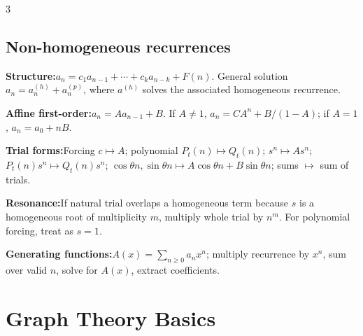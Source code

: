 \documentclass[10pt]{article}
\newenvironment{cheatitems}{\par\vspace{-1pt}}{\par\vspace{-1pt}}
\newcommand{\cheatrow}[2]{\par\noindent\textbf{#1:}\enspace #2\par}
\begin{document}
\begin{multicols}{3}
\subsection*{Non-homogeneous recurrences}
\begin{cheatitems}
\cheatrow{Structure}{$a_n=c_1a_{n-1}+\cdots+c_ka_{n-k}+F(n)$. General solution $a_n=a_n^{(h)}+a_n^{(p)}$, where $a^{(h)}$ solves the associated homogeneous recurrence.}
\cheatrow{Affine first-order}{$a_n=Aa_{n-1}+B$. If $A\ne1$, $a_n=CA^n+B/(1-A)$; if $A=1$, $a_n=a_0+nB$.}
\cheatrow{Trial forms}{Forcing $c\mapsto A$; polynomial $P_t(n)\mapsto Q_t(n)$; $s^n\mapsto As^n$; $P_t(n)s^n\mapsto Q_t(n)s^n$; $\cos\theta n,\sin\theta n\mapsto A\cos\theta n+B\sin\theta n$; sums $\mapsto$ sum of trials.}
\cheatrow{Resonance}{If natural trial overlaps a homogeneous term because $s$ is a homogeneous root of multiplicity $m$, multiply whole trial by $n^m$. For polynomial forcing, treat as $s=1$.}
\cheatrow{Generating functions}{$A(x)=\sum_{n\ge0}a_nx^n$; multiply recurrence by $x^n$, sum over valid $n$, solve for $A(x)$, extract coefficients.}
\end{cheatitems}

\section*{Graph Theory Basics}

\end{multicols}
\end{document}
